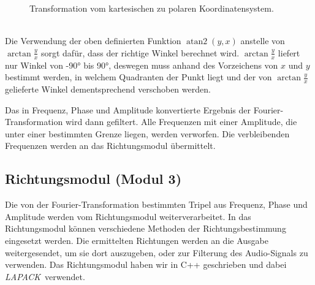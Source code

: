 \begin{minipage}{0.49\textwidth}
    \begin{figure}[H]
        \centering
        \hspace*{-2cm}
        \caption{Transformation vom kartesischen zu polaren Koordinatensystem\label{fig:polarconvert}.}
    \end{figure}
\vspace{10pt}
\end{minipage}
\\
Die Verwendung der oben definierten Funktion $\operatorname{atan2}(y,x)$ anstelle von $\arctan\frac{y}{x}$ sorgt dafür, dass der richtige Winkel berechnet wird. $\arctan\frac{y}{x}$ liefert nur Winkel von \ang{-90} bis \ang{90}, deswegen muss anhand des Vorzeichens von $x$ und $y$ bestimmt werden, in welchem Quadranten der Punkt liegt und der von $\arctan\frac{y}{x}$ gelieferte Winkel dementsprechend verschoben werden.

Das in Frequenz, Phase und Amplitude konvertierte Ergebnis der Fourier-Transformation wird dann gefiltert. Alle Frequenzen mit einer Amplitude, die unter einer bestimmten Grenze liegen, werden verworfen. Die verbleibenden Frequenzen werden an das Richtungsmodul übermittelt.

\subsection{Richtungsmodul (Modul 3)}
Die von der Fourier-Transformation bestimmten Tripel aus Frequenz, Phase und Amplitude werden vom Richtungsmodul weiterverarbeitet. In das Richtungsmodul können verschiedene Methoden der Richtungsbestimmung eingesetzt werden. Die ermittelten Richtungen werden an die Ausgabe weitergesendet, um sie dort auszugeben, oder zur Filterung des Audio-Signals zu verwenden.
Das Richtungsmodul haben wir in C++ geschrieben und dabei \textit{LAPACK}~\cite{Anderson:1990:LPL:110382.110385}verwendet.
\pagebreak
